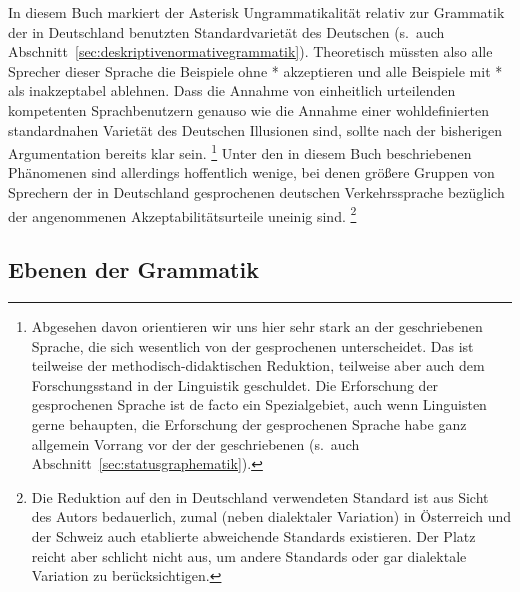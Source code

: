 In diesem Buch markiert der Asterisk Ungrammatikalität relativ zur Grammatik der in Deutschland benutzten Standardvarietät des Deutschen (s.\ auch Abschnitt~\ref{sec:deskriptivenormativegrammatik}).
Theoretisch müssten also alle Sprecher dieser Sprache die Beispiele ohne * akzeptieren und alle Beispiele mit * als inakzeptabel ablehnen.
Dass die Annahme von einheitlich urteilenden kompetenten Sprachbenutzern genauso wie die Annahme einer wohldefinierten standardnahen Varietät des Deutschen Illusionen sind, sollte nach der bisherigen Argumentation bereits klar sein.%
\footnote{Abgesehen davon orientieren wir uns hier sehr stark an der geschriebenen Sprache, die sich wesentlich von der gesprochenen unterscheidet.
Das ist teilweise der methodisch-didaktischen Reduktion, teilweise aber auch dem Forschungsstand in der Linguistik geschuldet.
Die Erforschung der gesprochenen Sprache ist de facto ein Spezialgebiet, auch wenn Linguisten gerne behaupten, die Erforschung der gesprochenen Sprache habe ganz allgemein Vorrang vor der der geschriebenen (s.\ auch Abschnitt~\ref{sec:statusgraphematik}).}
Unter den in diesem Buch beschriebenen Phänomenen sind allerdings hoffentlich wenige, bei denen größere Gruppen von Sprechern der in Deutschland gesprochenen deutschen Verkehrssprache bezüglich der angenommenen Akzeptabilitätsurteile uneinig sind.%
\footnote{Die Reduktion auf den in Deutschland verwendeten Standard ist aus Sicht des Autors bedauerlich, zumal (neben dialektaler Variation) in Österreich und der Schweiz auch etablierte abweichende Standards existieren.
Der Platz reicht aber schlicht nicht aus, um andere Standards oder gar dialektale Variation zu berücksichtigen.}

\subsection{Ebenen der Grammatik}

\label{sec:ebenendergrammatik}



